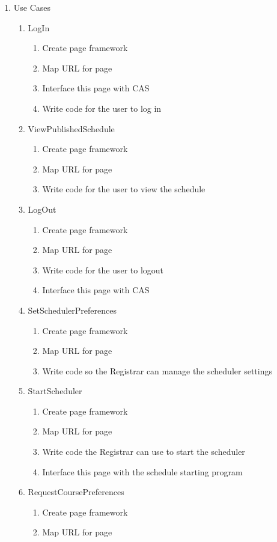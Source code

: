 \documentclass[11pt]{article}
\begin{document}
\begin{enumerate}
\item Use Cases
\begin{enumerate}
\item LogIn
\begin{enumerate}
\item Create page framework
\item Map URL for page
\item Interface this page with CAS
\item Write code for the user to log in
\end{enumerate}
\item ViewPublishedSchedule
\begin{enumerate}
\item Create page framework
\item Map URL for page
\item Write code for the user to view the schedule
\end{enumerate}
\item LogOut
\begin{enumerate}
\item Create page framework
\item Map URL for page
\item Write code for the user to logout
\item Interface this page with CAS
\end{enumerate}
\item SetSchedulerPreferences
 \begin{enumerate}
\item Create page framework
\item Map URL for page
\item Write code so the Registrar can manage the scheduler settings
\end{enumerate}
\item StartScheduler
\begin{enumerate}
\item Create page framework
\item Map URL for page
\item Write code the Registrar can use to start the scheduler
\item Interface this page with the schedule starting program
\end{enumerate}
\item RequestCoursePreferences
\begin{enumerate}
\item Create page framework
\item Map URL for page

\end{enumerate}
\end{enumerate}
\end{enumerate}
\end{document}
